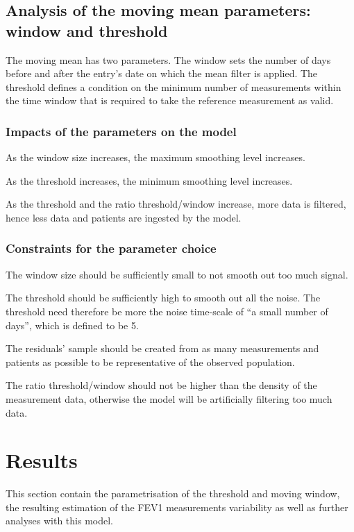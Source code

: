 \subsection{Analysis of the moving mean parameters: window and threshold}
The moving mean has two parameters. The window sets the number of days before and after the entry’s date on which the mean filter is applied. The threshold defines a condition on the minimum number of measurements within the time window that is required to take the reference measurement as valid. 

\subsubsection{Impacts of the parameters on the model}
\begin{enumimpact}
    \item As the window size increases, the maximum smoothing level increases.
    \item As the threshold increases, the minimum smoothing level increases.
    \item As the threshold and the ratio threshold/window increase, more data is filtered, hence less data and patients are ingested by the model.
\end{enumimpact}

\subsubsection{Constraints for the parameter choice}
\begin{enumconstraint}
    \item The window size should be sufficiently small to not smooth out too much signal.
    \item The threshold should be sufficiently high to smooth out all the noise. The threshold need therefore be more the noise time-scale of “a small number of days”, which is defined to be 5.
    \item The residuals’ sample should be created from as many measurements and patients as possible to be representative of the observed population.
    \item The ratio threshold/window should not be higher than the density of the measurement data, otherwise the model will be artificially filtering too much data.
\end{enumconstraint}

\section{Results}
This section contain the parametrisation of the threshold and moving window, the resulting estimation of the FEV1 measurements variability as well as further analyses with this model.

